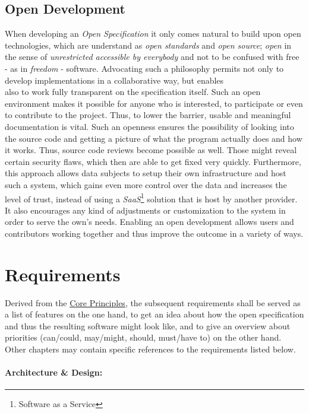 \documentclass[12pt,english,a4paper,titlepage,cleardoublepage=empty,dottedtoc]{report}
\begin{document}
\section{Open Development}\label{open-development}

When developing an \emph{Open Specification} it only comes natural to
build upon open technologies, which are understand as \emph{open
standards} and \emph{open source}; \emph{open} in the sense of
\emph{unrestricted accessible by everybody} and not to be confused with
free - as in \emph{freedom} - software. Advocating such a philosophy
permits not only to develop implementations in a collaborative way, but
enables\\
also to work fully transparent on the specification itself. Such an open
environment makes it possible for anyone who is interested, to
participate or even to contribute to the project. Thus, to lower the
barrier, usable and meaningful documentation is vital. Such an openness
ensures the possibility of looking into the source code and getting a
picture of what the program actually does and how it works. Thus, source
code reviews become possible as well. Those might reveal certain
security flaws, which then are able to get fixed very quickly.
Furthermore, this approach allows data subjects to setup their own
infrastructure and host such a system, which gains even more control
over the data and increases the level of trust, instead of using a
\emph{SaaS}\footnote{Software as a Service} solution that is host by
another provider. It also encourages any kind of adjustments or
customization to the system in order to serve the own's needs. Enabling
an open development allows users and contributors working together and
thus improve the outcome in a variety of ways.

\hypertarget{requirements}{\chapter{Requirements}\label{requirements}}

Derived from the \protect\hyperlink{core-principles}{Core Principles},
the subsequent requirements shall be served as a list of features on the
one hand, to get an idea about how the open specification and thus the
resulting software might look like, and to give an overview about
priorities (can/could, may/might, should, must/have to) on the other
hand. Other chapters may contain specific references to the requirements
listed below.

\subsubsection{Architecture \& Design:}\label{architecture-design}
\end{document}
